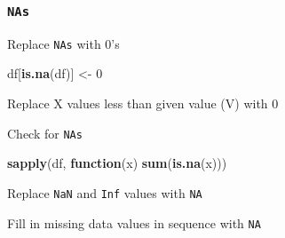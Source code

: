 \documentclass[10,portrait]{article}
\newenvironment{Shaded}{\begin{snugshade}}{\end{snugshade}}
\newcommand{\KeywordTok}[1]{\textcolor[rgb]{0.13,0.29,0.53}{\textbf{#1}}}
\newcommand{\DecValTok}[1]{\textcolor[rgb]{0.00,0.00,0.81}{#1}}
\newcommand{\StringTok}[1]{\textcolor[rgb]{0.31,0.60,0.02}{#1}}
\newcommand{\OtherTok}[1]{\textcolor[rgb]{0.56,0.35,0.01}{#1}}
\newcommand{\ControlFlowTok}[1]{\textcolor[rgb]{0.13,0.29,0.53}{\textbf{#1}}}
\newcommand{\OperatorTok}[1]{\textcolor[rgb]{0.81,0.36,0.00}{\textbf{#1}}}
\newcommand{\NormalTok}[1]{#1}
\begin{document}
\subsubsection{\texorpdfstring{\texttt{NAs}}{NAs}}\label{nas}

Replace \texttt{NAs} with 0's

\begin{Shaded}
\begin{Highlighting}[]
\NormalTok{df[}\KeywordTok{is.na}\NormalTok{(df)] <-}\StringTok{ }\DecValTok{0}
\end{Highlighting}
\end{Shaded}

Replace X values less than given value (V) with 0

\begin{Shaded}
\end{Shaded}

Check for \texttt{NAs}

\begin{Shaded}
\begin{Highlighting}[]
\KeywordTok{sapply}\NormalTok{(df, }\ControlFlowTok{function}\NormalTok{(x) }\KeywordTok{sum}\NormalTok{(}\KeywordTok{is.na}\NormalTok{(x)))}
\end{Highlighting}
\end{Shaded}

Replace \texttt{NaN} and \texttt{Inf} values with \texttt{NA}

\begin{Shaded}
\end{Shaded}

Fill in missing data values in sequence with \texttt{NA}
\end{document}
